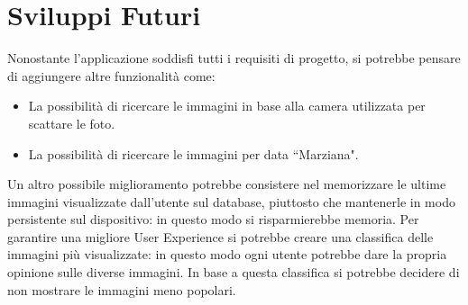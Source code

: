 \section{Sviluppi Futuri}
Nonostante l'applicazione soddisfi tutti i requisiti di progetto, si potrebbe pensare di aggiungere altre funzionalit\`a come:
\begin{itemize}
    \item La possibilit\`a di ricercare le immagini in base alla camera utilizzata per scattare le foto.
    \item La possibilit\`a di ricercare le immagini per data ``Marziana".
\end{itemize}
Un altro possibile miglioramento potrebbe consistere nel memorizzare le ultime immagini visualizzate dall'utente sul database, piuttosto che mantenerle in modo persistente sul dispositivo: in questo
modo si risparmierebbe memoria.
Per garantire una migliore User Experience si potrebbe creare una classifica delle immagini pi\`u visualizzate: in questo modo ogni utente potrebbe dare la propria opinione sulle diverse immagini. In base a questa
classifica si potrebbe decidere di non mostrare le immagini meno popolari.